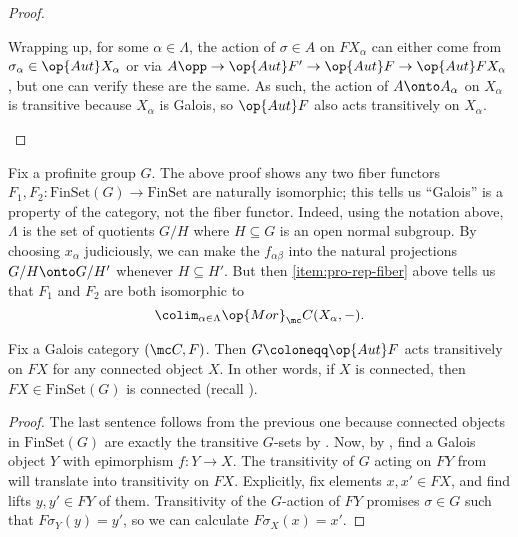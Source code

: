 \documentclass{amsart}
\begin{document}
\begin{proof}
\begin{enumerate}
        
        Wrapping up, for some $\alpha\in\Lambda$, the action of $\sigma\in A$ on $FX_\alpha$ can either come from $\sigma_\alpha\in\op{Aut}X_\alpha$ or via $A\opp\to\op{Aut}F'\to\op{Aut}F\to\op{Aut}FX_\alpha$, but one can verify these are the same.
        As such, the action of $A\onto A_\alpha$ on $X_\alpha$ is transitive because $X_\alpha$ is Galois, so $\op{Aut}F$ also acts transitively on $X_\alpha$.
        \qedhere
    \end{enumerate}
\end{proof}
\begin{remark} \label{rem:profinite-fiber-functor-unique}
    Fix a profinite group $G$. The above proof shows any two fiber functors $F_1,F_2\colon\mathrm{FinSet}(G)\to\mathrm{FinSet}$ are naturally isomorphic; this tells us ``Galois'' is a property of the category, not the fiber functor. Indeed, using the notation above, $\Lambda$ is the set of quotients $G/H$ where $H\subseteq G$ is an open normal subgroup. By choosing $x_\alpha$ judiciously, we can make the $f_{\alpha\beta}$ into the natural projections $G/H\onto G/H'$ whenever $H\subseteq H'$. But then \eqref{item:pro-rep-fiber} above tells us that $F_1$ and $F_2$ are both isomorphic to
    \[\colim_{\alpha\in\Lambda}\op{Mor}_\mc C(X_\alpha,-).\]
\end{remark}
\begin{corollary} \label{cor:connected-to-connected}
    Fix a Galois category $(\mc C,F)$. Then $G\coloneqq\op{Aut}F$ acts transitively on $FX$ for any connected object $X$. In other words, if $X$ is connected, then $FX\in\mathrm{FinSet}(G)$ is connected (recall ).
\end{corollary}
\begin{proof}
    The last sentence follows from the previous one because connected objects in $\mathrm{FinSet}(G)$ are exactly the transitive $G$-sets by . Now, by , find a Galois object $Y$ with epimorphism $f\colon Y\to X$. The transitivity of $G$ acting on $FY$ from  will translate into transitivity on $FX$. Explicitly, fix elements $x,x'\in FX$, and find lifts $y,y'\in FY$ of them. Transitivity of the $G$-action of $FY$ promises $\sigma\in G$ such that $F\sigma_Y(y)=y'$, so we can calculate $F\sigma_X(x)=x'$.
\end{proof}
\end{document}
